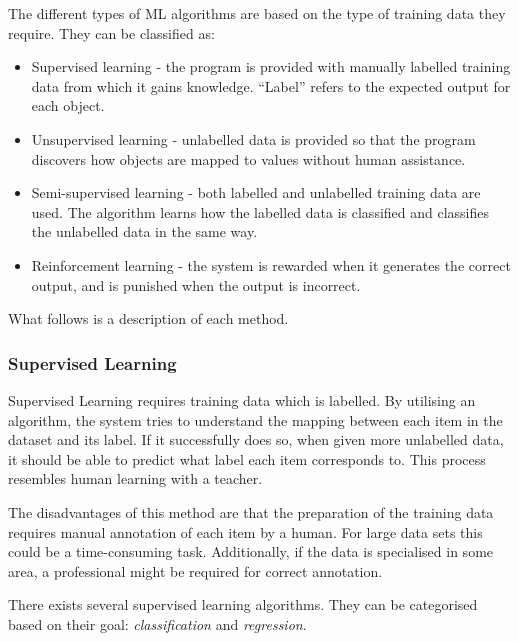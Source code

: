 \documentclass[12pt,a4paper]{article}
\newcommand{\captionstyle}[1] {
    \small{#1}
}
\begin{document}
 The different types of ML algorithms are based on the type of training data they require. They can be classified as:
\begin{itemize}
	\item Supervised learning - the program is provided with manually labelled training data from which it gains knowledge. \enquote{Label} refers to the expected output for each object.
	\item Unsupervised learning - unlabelled data is provided so that the program discovers how objects are mapped to values without human assistance.
	\item Semi-supervised learning - both labelled and unlabelled training data are used. The algorithm learns how the labelled data is classified and classifies the unlabelled data in the same way.
	\item Reinforcement learning - the system is rewarded when it generates the correct output, and is punished when the output is incorrect.
\end{itemize}

What follows is a description of each method.

\subsubsection{Supervised Learning}
Supervised Learning requires training data which is labelled. By utilising an algorithm, the system tries to understand the mapping between each item in the dataset and its label. If it successfully does so, when given more unlabelled data, it should be able to predict what label each item corresponds to. This process resembles human learning with a teacher.

The disadvantages of this method are that the preparation of the training data requires manual annotation of each item by a human. For large data sets this could be a time-consuming task. Additionally, if the data is specialised in some area, a professional might be required for correct annotation.

There exists several supervised learning algorithms. They can be categorised based on their goal: \textit{classification} and \textit{regression}.

\end{document}
